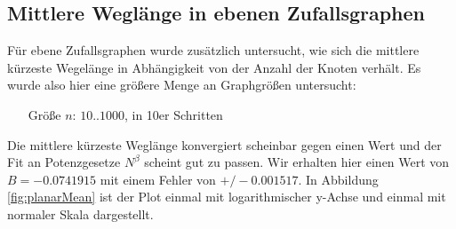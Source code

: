\documentclass[10pt]{article}
\begin{document}
\subsection{Mittlere Weglänge in ebenen Zufallsgraphen}
Für ebene Zufallsgraphen wurde zusätzlich untersucht, wie sich die mittlere kürzeste Wegelänge in Abhängigkeit von der Anzahl der Knoten verhält. Es wurde also hier eine größere Menge an Graphgrößen untersucht:
\begin{itemize}
\item[\quad Größe $n$:] $10..1000$, in 10er Schritten
\end{itemize}
Die mittlere kürzeste Weglänge konvergiert scheinbar gegen einen Wert und der Fit an Potenzgesetze $N^\beta$ scheint gut zu passen. Wir erhalten hier einen Wert von $B= -0.0741915$ mit einem Fehler von $+/- 0.001517$. In Abbildung \ref{fig:planarMean} ist der Plot einmal mit logarithmischer y-Achse und einmal mit normaler Skala dargestellt.
\end{document}
